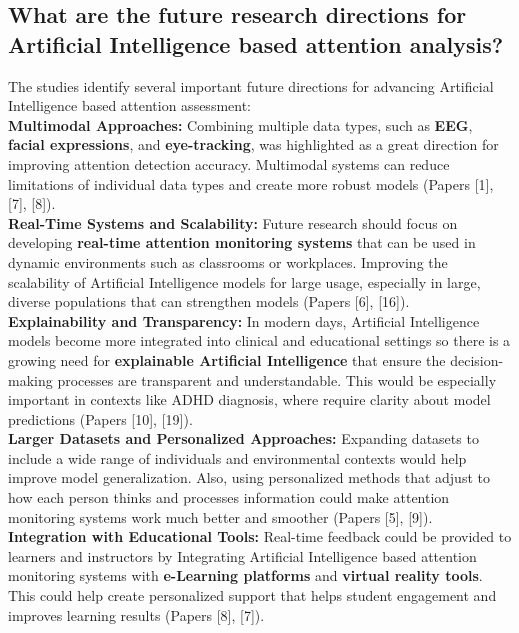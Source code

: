\documentclass[12pt]{article}
\begin{document}
\subsection{ What are the future research directions for Artificial Intelligence based attention analysis?} 

The studies identify several important future directions for advancing Artificial Intelligence based attention assessment: \\

\textbullet \textbf{Multimodal Approaches:} Combining multiple data types, such as \textbf{EEG}, \textbf{facial expressions}, and \textbf{eye-tracking}, was highlighted as a great direction for improving attention detection accuracy. Multimodal systems can reduce limitations of individual data types and create more robust models (Papers [1], [7], [8]). \\ 

\textbullet \textbf{Real-Time Systems and Scalability:} Future research should focus on developing \textbf{real-time attention monitoring systems} that can be used in dynamic environments such as classrooms or workplaces. Improving the scalability of Artificial Intelligence models for large usage, especially in large, diverse populations that can strengthen models (Papers [6], [16]). \\ 

\textbullet \textbf{Explainability and Transparency:} In modern days, Artificial Intelligence models become more integrated into clinical and educational settings so there is a growing need for \textbf{explainable Artificial Intelligence} that ensure the decision-making processes are transparent and understandable. This would be especially important in contexts like ADHD diagnosis, where require clarity about model predictions (Papers [10], [19]). \\ 

\textbullet \textbf{Larger Datasets and Personalized Approaches:} Expanding datasets to include a wide range of individuals and environmental contexts would help improve model generalization. Also, using personalized methods that adjust to how each person thinks and processes information could make attention monitoring systems work much better and smoother (Papers [5], [9]). \\ 

\textbullet \textbf{Integration with Educational Tools:} Real-time feedback could be provided to learners and instructors by Integrating Artificial Intelligence based attention monitoring systems with \textbf{e-Learning platforms} and \textbf{virtual reality tools}. This could help create personalized support that helps student engagement and improves learning results (Papers [8], [7]). \\ \\
\end{document}
